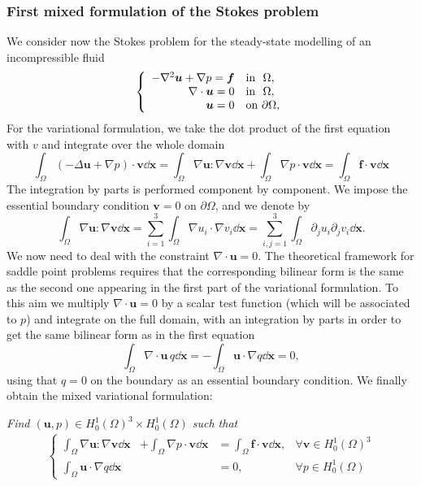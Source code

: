 \subsubsection*{First mixed formulation of the Stokes problem}
We consider now the Stokes problem for the steady-state modelling of an incompressible fluid
\begin{align}
  \left\{
    \begin{array}{rl}
      - \nabla^2 \uu + \nabla p = \ff & \mbox{in} ~ \Omega,  \\
      \Div \uu          = 0   & \mbox{in} ~ \Omega,  \\
      \uu               = 0   & \mbox{on} ~ \partial \Omega,
    \end{array}
    \right.
    \label{eq:stokes}
\end{align}
For the variational formulation, we take the dot product of the first equation with $v$ and integrate over the whole domain
$$\int_{\Omega} (-\Delta \mathbf{u} + \nabla p)\cdot \mathbf{v} \dd \mathbf{x} 
=\int_{\Omega}\nabla \mathbf{u}:\nabla \mathbf{v} \dd \mathbf{x} + \int_{\Omega} \nabla p \cdot \mathbf{v} \dd \mathbf{x}
= \int_{\Omega} \mathbf{f}\cdot \mathbf{v} \dd \mathbf{x}$$
The integration by parts is performed component by component. We impose the essential boundary condition $ \mathbf{v}=0$ on $\partial\Omega$, and we denote by
$$\int_{\Omega}\nabla \mathbf{u}:\nabla \mathbf{v} \dd \mathbf{x} =\sum_{i=1}^3 \int_{\Omega}\nabla u_i\cdot\nabla v_i \dd \mathbf{x} =\sum_{i,j=1}^3 \int_{\Omega}\partial_j u_i\partial_j v_i \dd \mathbf{x} .$$
We now need to deal with the constraint $\nabla\cdot \mathbf{u}=0$. The theoretical framework for saddle point problems requires that the corresponding bilinear form is the same as the second one appearing in the first part of the variational formulation. To this aim we multiply  $\nabla\cdot \mathbf{u}=0$ by a scalar test function (which will be associated to $p$) and integrate on the full domain, with an integration by parts in order to get the same bilinear form as in the first equation
$$\int_{\Omega} \nabla\cdot \mathbf{u} \,q \dd \mathbf{x}= - \int_{\Omega} \mathbf{u}\cdot \nabla q\dd \mathbf{x}=0,$$
using that $q=0$ on the boundary as an essential boundary condition.
We finally obtain the mixed variational formulation: 
\begin{tcolorbox}
  {\em Find $( \mathbf{u},p)\in H^1_0(\Omega)^3\times H^1_0(\Omega)$ such that }
  \begin{align}
    \left\{
      \begin{array}{llll}
        \int_{\Omega}\nabla \mathbf{u}:\nabla \mathbf{v} \dd \mathbf{x} &+ \int_{\Omega} \nabla p \cdot \mathbf{v} \dd \mathbf{x}
        &= \int_{\Omega} \mathbf{f}\cdot \mathbf{v} \dd \mathbf{x}, & \forall \mathbf{v}\in H_0^1(\Omega)^3 \\
        \int_{\Omega} \mathbf{u}\cdot \nabla q\dd \mathbf{x} & &=0, & \forall p\in H^1_0(\Omega)
      \end{array}
      \right.
  \label{eq:abs_var_mixed_stokes_1}
  \end{align}
\end{tcolorbox}
%
